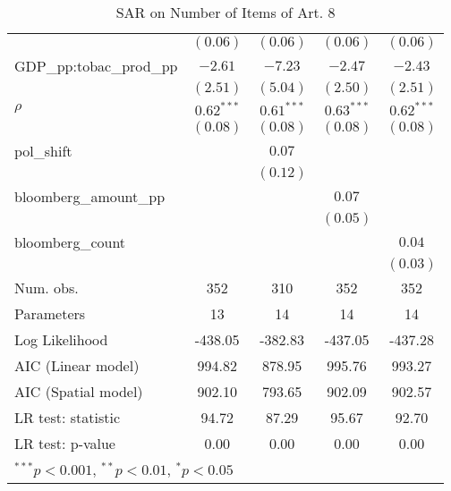 \begin{table}[!h]
\begin{center}
\begin{tabular}{l c c c c }
                         & $(0.06)$     & $(0.06)$     & $(0.06)$     & $(0.06)$     \\
GDP\_pp:tobac\_prod\_pp  & $-2.61$      & $-7.23$      & $-2.47$      & $-2.43$      \\
                         & $(2.51)$     & $(5.04)$     & $(2.50)$     & $(2.51)$     \\
$\rho$                   & $0.62^{***}$ & $0.61^{***}$ & $0.63^{***}$ & $0.62^{***}$ \\
                         & $(0.08)$     & $(0.08)$     & $(0.08)$     & $(0.08)$     \\
pol\_shift               &              & $0.07$       &              &              \\
                         &              & $(0.12)$     &              &              \\
bloomberg\_amount\_pp    &              &              & $0.07$       &              \\
                         &              &              & $(0.05)$     &              \\
bloomberg\_count         &              &              &              & $0.04$       \\
                         &              &              &              & $(0.03)$     \\
\midrule
Num. obs.                & 352          & 310          & 352          & 352          \\
Parameters               & 13           & 14           & 14           & 14           \\
Log Likelihood           & -438.05      & -382.83      & -437.05      & -437.28      \\
AIC (Linear model)       & 994.82       & 878.95       & 995.76       & 993.27       \\
AIC (Spatial model)      & 902.10       & 793.65       & 902.09       & 902.57       \\
LR test: statistic       & 94.72        & 87.29        & 95.67        & 92.70        \\
LR test: p-value         & 0.00         & 0.00         & 0.00         & 0.00         \\
\bottomrule
\multicolumn{5}{l}{\scriptsize{$^{***}p<0.001$, $^{**}p<0.01$, $^*p<0.05$}}
\end{tabular}
\caption{SAR on Number of Items of Art. 8}
\label{table:coefficients}
\end{center}
\end{table}
